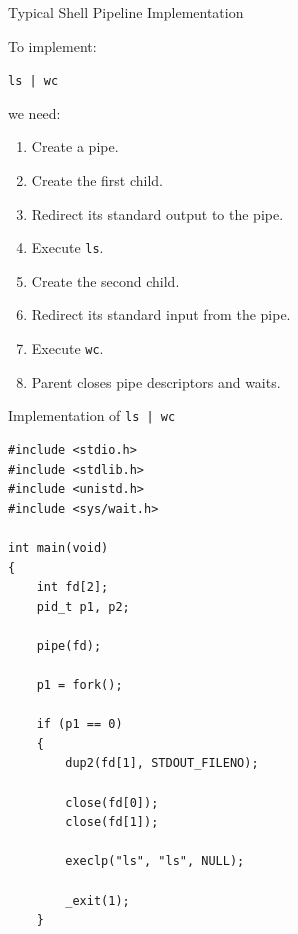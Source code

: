 \documentclass[aspectratio=169]{beamer}
\begin{document}
\begin{frame}{Typical Shell Pipeline Implementation}

To implement:

\begin{center}
\texttt{ls | wc}
\end{center}

we need:

\begin{enumerate}

    \item Create a pipe.
    \item Create the first child.
    \item Redirect its standard output to the pipe.
    \item Execute \texttt{ls}.
    \item Create the second child.
    \item Redirect its standard input from the pipe.
    \item Execute \texttt{wc}.
    \item Parent closes pipe descriptors and waits.
\end{enumerate}

\end{frame}

\begin{frame}[fragile]{Implementation of \texttt{ls | wc}}

\begin{lstlisting}[style=cstyle]
#include <stdio.h>
#include <stdlib.h>
#include <unistd.h>
#include <sys/wait.h>

int main(void)
{
    int fd[2];
    pid_t p1, p2;

    pipe(fd);

    p1 = fork();

    if (p1 == 0)
    {
        dup2(fd[1], STDOUT_FILENO);

        close(fd[0]);
        close(fd[1]);

        execlp("ls", "ls", NULL);

        _exit(1);
    }
\end{lstlisting}

\end{frame}
\end{document}
